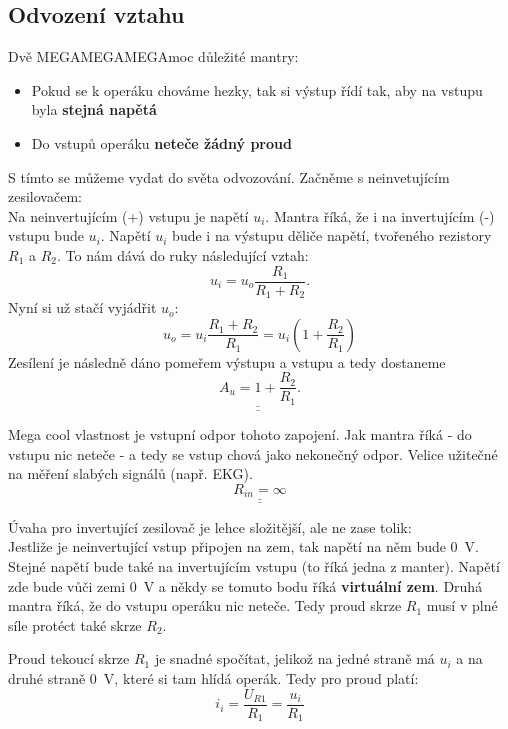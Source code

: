 \documentclass[a4paper,12pt]{article}   %
\begin{document}
\subsection*{Odvození vztahu}
Dvě MEGAMEGAMEGAmoc důležité mantry:
\begin{itemize}
    \item Pokud se k operáku chováme hezky, tak si výstup řídí tak, aby na vstupu byla \textbf{stejná napětá}
    \item Do vstupů operáku \textbf{neteče žádný proud}
\end{itemize}

S tímto se můžeme vydat do světa odvozování. Začněme s neinvetujícím zesilovačem:\\
Na neinvertujícím (+) vstupu je napětí $u_i$. Mantra říká, že i na invertujícím (-) vstupu bude $u_i$. Napětí $u_i$ bude i na výstupu děliče napětí, tvořeného rezistory $R_1$ a $R_2$. To nám dává do ruky následující vztah:
\begin{equation*}
    u_i = u_o \frac{R_1}{R_1 + R_2}.
\end{equation*}
Nyní si už stačí vyjádřit $u_o$:
\begin{equation*}
    u_o = u_i \frac{R_1 + R_2}{R_1} = u_i (1+\frac{R_2}{R_1})
\end{equation*}
Zesílení je následně dáno pomeřem výstupu a vstupu a tedy dostaneme
\begin{equation*}
    \underline{\underline{A_u = 1+\frac{R_2}{R_1}}}.
\end{equation*}

Mega cool vlastnost je vstupní odpor tohoto zapojení. Jak mantra říká - do vstupu nic neteče - a tedy se vstup chová jako nekonečný odpor. Velice užitečné na měření slabých signálů (např. EKG).
\begin{equation*}
    \underline{\underline{R_{in} = \infty}}
\end{equation*}

Úvaha pro invertující zesilovač je lehce složitější, ale ne zase tolik:\\
Jestliže je neinvertující vstup připojen na zem, tak napětí na něm bude $0$~V. Stejné napětí bude také na invertujícím vstupu (to říká jedna z manter). Napětí zde bude vůči zemi 0~V a někdy se tomuto bodu říká \textbf{virtuální zem}. Druhá mantra říká, že do vstupu operáku nic neteče. Tedy proud skrze $R_1$ musí v plné síle protéct také skrze $R_2$.

Proud tekoucí skrze $R_1$ je snadné spočítat, jelikož na jedné straně má $u_i$ a na druhé straně 0~V, které si tam hlídá operák. Tedy pro proud platí:
\begin{equation*}
    i_i = \frac{U_{R1}}{R_1} = \frac{u_i}{R_1}
\end{equation*}
\end{document}
